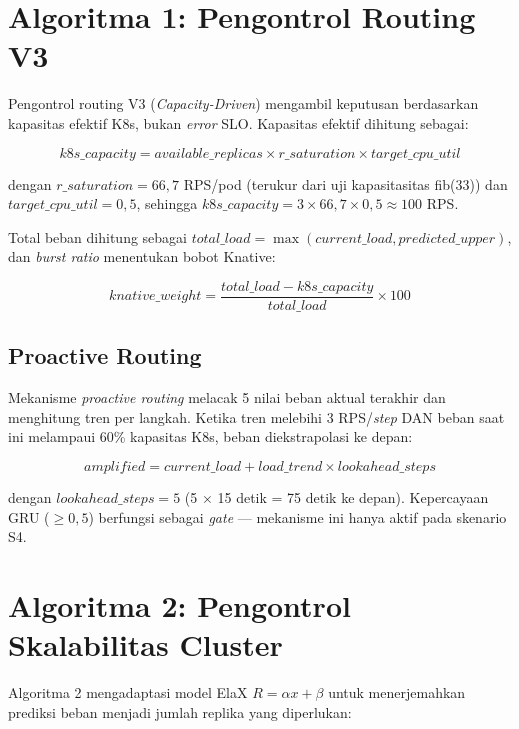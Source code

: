 \section{Algoritma 1: Pengontrol Routing V3}
\label{sec:algoritma-1-v3}

Pengontrol routing V3 (\emph{Capacity-Driven}) mengambil keputusan berdasarkan kapasitas efektif K8s, bukan \emph{error} SLO. Kapasitas efektif dihitung sebagai:

\begin{equation}
    k8s\_capacity = available\_replicas \times r\_saturation \times target\_cpu\_util
\end{equation}

dengan $r\_saturation = 66,7$ RPS/pod (terukur dari uji kapasitasitas fib(33)) dan $target\_cpu\_util = 0,5$, sehingga $k8s\_capacity = 3 \times 66,7 \times 0,5 \approx 100$ RPS.

Total beban dihitung sebagai $total\_load = \max(current\_load, predicted\_upper)$, dan \emph{burst ratio} menentukan bobot Knative:

\begin{equation}
    knative\_weight = \frac{total\_load - k8s\_capacity}{total\_load} \times 100
\end{equation}

\subsection{Proactive Routing}

Mekanisme \emph{proactive routing} melacak 5 nilai beban aktual terakhir dan menghitung tren per langkah. Ketika tren melebihi 3 RPS/\emph{step} DAN beban saat ini melampaui 60\% kapasitas K8s, beban diekstrapolasi ke depan:

\begin{equation}
    amplified = current\_load + load\_trend \times lookahead\_steps
\end{equation}

dengan $lookahead\_steps = 5$ (5 $\times$ 15 detik = 75 detik ke depan). Kepercayaan GRU ($\geq 0,5$) berfungsi sebagai \emph{gate} — mekanisme ini hanya aktif pada skenario S4.

\section{Algoritma 2: Pengontrol Skalabilitas Cluster}
\label{sec:algoritma-2}

Algoritma 2 mengadaptasi model ElaX $R = \alpha x + \beta$ untuk menerjemahkan prediksi beban menjadi jumlah replika yang diperlukan:

